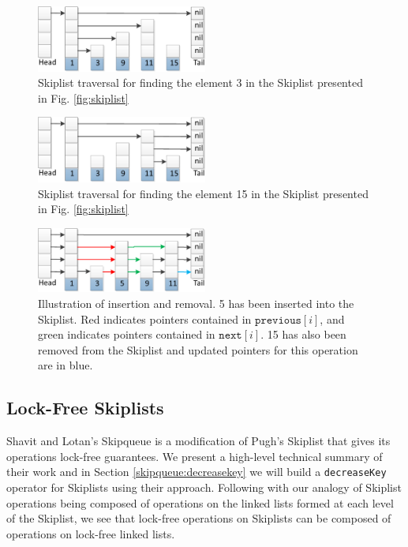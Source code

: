 \documentclass{acm_proc_article-sp}
\begin{document}
\begin{figure}[H]
  \includegraphics[width=0.5\textwidth]{img/skiplistSearch-crop.pdf}
  \caption{Skiplist traversal for finding the element 3 in the Skiplist presented in Fig. \ref{fig:skiplist}}
  \label{fig:skiplist:search3}
\end{figure}

\begin{figure}[H]
  \includegraphics[width=0.5\textwidth]{img/skiplistSearch15-crop.pdf}
  \caption{Skiplist traversal for finding the element 15 in the Skiplist presented in Fig. \ref{fig:skiplist}}
  \label{fig:skiplist:search15}
\end{figure}

\begin{figure}[H]
  \includegraphics[width=0.5\textwidth]{img/skiplistInsert5-crop.pdf}
  \caption{Illustration of insertion and removal. 5 has been inserted into the Skiplist. Red indicates pointers contained in $\texttt{previous}[i]$, and green indicates pointers contained in $\texttt{next}[i]$. 15 has also been removed from the Skiplist and updated pointers for this operation are in blue.}
  \label{fig:skiplist:insert5}
\end{figure}

\subsection{Lock-Free Skiplists}
Shavit and Lotan's Skipqueue \cite{shavit00} is a modification
of Pugh's Skiplist that gives its operations lock-free guarantees.
We present a high-level technical summary of their work and in
Section \ref{skipqueue:decreasekey} we will
build a \texttt{decreaseKey} operator for Skiplists using their approach.
Following with our analogy of Skiplist
operations being composed of operations on the linked lists formed at each level
of the Skiplist, we see that lock-free
operations on Skiplists can be composed of operations on lock-free linked lists.
\end{document}
